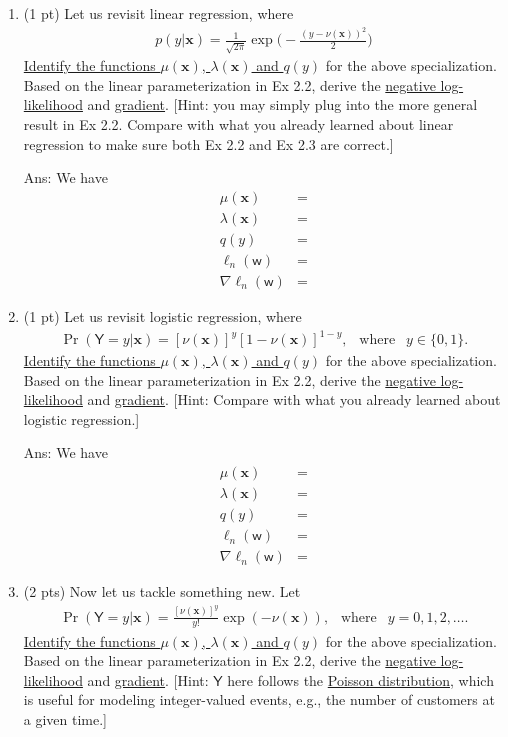 \documentclass[10pt]{article}
\newcommand{\xv}{\mathbf{x}}
\newcommand{\wbs}{\bm{\mathsf{w}}}
\newcommand{\Ysf}{\mathsf{Y}}
\newcommand{\eg}{{e.g.}\xspace}
\newcommand{\ans}[1]{{\color{orange}\textsf{Ans}: #1}}
\begin{document}
\begin{exercise}
\begin{enumerate}
\ans{
We have 
\begin{align}
\ell_n(\wbs) = 
\end{align}
and hence 
\begin{align}
\nabla \ell_n(\wbs) =
\end{align}
}


\item (1 pt) Let us revisit linear regression, where 
	\begin{align}
	p(y | \xv) =\tfrac{1}{\sqrt{2\pi}}\exp\big(-\tfrac{(y - \nu(\xv))^2}{2}\big)
	\end{align}
	\uline{Identify the functions $\mu(\xv)$, $\lambda(\xv)$ and $q(y)$} for the above specialization. Based on the linear parameterization in Ex 2.2, derive the \uline{negative log-likelihood} and \uline{gradient}. [Hint: you may simply plug into the more general result in Ex 2.2. Compare with what you already learned about linear regression to make sure both Ex 2.2 and Ex 2.3 are correct.]
	
\ans{
We have 
\begin{align}
\mu(\xv) &=  \\
\lambda(\xv) &= \\
q(y) &=  \\
\ell_n(\wbs) &= \\
\nabla\ell_n(\wbs) &=
\end{align}
}

\item (1 pt) Let us revisit logistic regression, where 
	\begin{align}
	\Pr( \Ysf = y | \xv) =[\nu(\xv)]^{y} [1-\nu(\xv)]^{1-y}, ~~\mbox{ where } ~~ y \in \{0, 1\}.
	\end{align}
	\uline{Identify the functions $\mu(\xv)$, $\lambda(\xv)$ and $q(y)$} for the above specialization. Based on the linear parameterization in Ex 2.2, derive the \uline{negative log-likelihood} and \uline{gradient}.  [Hint: Compare with what you already learned about logistic regression.]
	
\ans{
We have 
\begin{align}
\mu(\xv) &=  \\
\lambda(\xv) &= \\
q(y) &=  \\
\ell_n(\wbs) &= \\
\nabla\ell_n(\wbs) &=
\end{align}
}

\item (2 pts) Now let us tackle something new. Let 
	\begin{align}
	\Pr(\Ysf = y | \xv) = \frac{[\nu(\xv)]^y}{y!} \exp(-\nu(\xv)), ~~ \mbox{ where } ~~ y = 0, 1, 2, \ldots.
	\end{align}
	\uline{Identify the functions $\mu(\xv)$, $\lambda(\xv)$ and $q(y)$} for the above specialization. Based on the linear parameterization in Ex 2.2, derive the \uline{negative log-likelihood} and \uline{gradient}. [Hint: $\Ysf$ here follows the \href{https://en.wikipedia.org/wiki/Poisson_distribution}{Poisson distribution}, which is useful for modeling integer-valued events, \eg, the number of customers at a given time.]
	

\end{enumerate}
\end{exercise}
\end{document}
